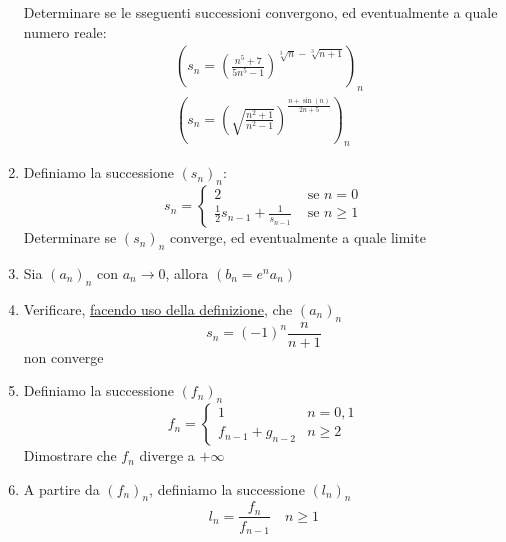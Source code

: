 \begin{enumerate}
{	      }
	      Determinare se le sseguenti successioni convergono, ed eventualmente a quale numero reale:
	      \begin{align*}
		       & \left(s_n = \left(\frac{n^{5} + 7}{5 n ^{5} - 1}\right)^{\displaystyle \sqrt[3]{n} - \sqrt[3]{n + 1}}\right)_n           \\
		       & \left(s_n = \left(\sqrt{\frac{n^2 + 1}{n^2  -1}}\right) ^{\displaystyle \frac{n + \sin \left(n\right)}{2n + 5}}\right)_n
	      \end{align*}
	\item Definiamo la successione $ \left(s_n\right)_n $:
	      \[
		      s_n = \begin{cases}
			      2                                       & \text{ se } n = 0   \\
			      \frac{1}{2} s_{n-1} + \frac{1}{s_{n-1}} & \text{ se } n \ge 1
		      \end{cases}
	      \]
	      Determinare se $ \left(s_n\right)_n $ converge, ed eventualmente a quale limite
	\item Sia $ \left(a_n\right)_n $ con $ a_n \to 0$, allora $ (b_n = e^{n}a_n) $
	\item Verificare, \underline{facendo uso della definizione}, che $ \left(a_n\right)_n $
	      \[
		      s_n = \left(-1\right)^{n} \frac{n}{n +1 }
	      \]
	      non converge
	\item Definiamo la successione $ \left(f_n \right)_n $
	      \[
		      f_n =
		      \begin{cases}
			      1                  & n = 0, 1 \\
			      f_{n-1} + g _{n-2} & n \ge  2
		      \end{cases}
	      \]
	      Dimostrare che $ f_n $ diverge a $ + \infty  $
	\item A partire da $ \left(f_n\right)_n $, definiamo la successione $ \left(l_n\right)_n $
	      \[
		      l_n = \frac{f_n}{f_{n-1}} \quad n \ge 1
\]
\end{enumerate}
